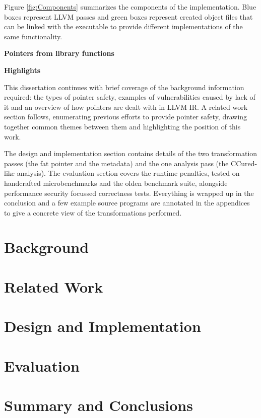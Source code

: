 \documentclass[a4paper,12pt,twoside,openright]{report}
\begin{document}
Figure \ref{fig:Components} summarizes the components of the implementation.
Blue boxes represent LLVM passes and green boxes represent created object files that can be linked with the executable to provide different implementations of the same functionality.

\textbf{Pointers from library functions}

\textbf{Highlights}

This dissertation continues with brief coverage of the background information required: the types of pointer safety, examples of vulnerabilities caused by lack of it and an overview of how pointers are dealt with in LLVM IR.
A related work section follows, enumerating previous efforts to provide pointer safety, drawing together common themes between them and highlighting the position of this work.

The design and implementation section contains details of the two transformation passes (the fat pointer and the metadata) and the one analysis pass (the CCured-like analysis).
The evaluation section covers the runtime penalties, tested on handcrafted microbenchmarks and the olden benchmark suite, alongside performance security focussed correctness tests.
Everything is wrapped up in the conclusion and a few example source programs are annotated in the appendices to give a concrete view of the transformations performed.

\chapter{Background} 


\chapter{Related Work} 


\chapter{Design and Implementation} 


\chapter{Evaluation} 


\chapter{Summary and Conclusions} 
\end{document}
